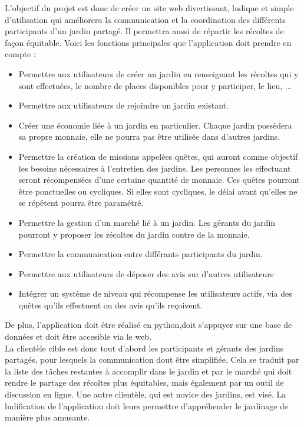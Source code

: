 \documentclass{report}
\begin{document}
    L'objectif du projet est donc de créer un site web divertissant, ludique et simple d’utilisation qui améliorera la communication et la coordination des différents participants d’un jardin partagé. Il permettra aussi de répartir les récoltes de façon équitable. Voici les fonctions principales que l'application doit prendre en compte :
    \begin{itemize}
        \item Permettre aux utilisateurs de créer un jardin en renseignant les récoltes qui y sont effectuées, le nombre de places disponibles pour y participer, le lieu, ...
        \item Permettre aux utilisateurs de rejoindre un jardin existant.
        \item Créer une économie liée à un jardin en particulier. Chaque jardin possèdera sa propre monnaie, elle ne pourra pas être utilisée dans d’autres jardins.
        \item Permettre la création de missions appelées quêtes, qui auront comme objectif les besoins nécessaires à l’entretien des jardins. Les personnes les effectuant seront récompensées d’une certaine quantité de monnaie. Ces quêtes pourront être ponctuelles ou cycliques. Si elles sont cycliques, le délai avant qu'elles ne se répétent pourra être paramétré.
        \item Permettre la gestion d'un marché lié à un jardin. Les gérants du jardin pourront y proposer les récoltes du jardin contre de la monnaie. \item Permettre la communication entre différants participants du jardin.
        \item Permettre aux utilisateurs de déposer des avis sur d'autres utilisateurs 
        \item Intégrer un système de niveau qui récompense les utilisateurs actifs, via des quêtes qu'ils effectuent ou des avis qu'ils reçoivent.
    \end{itemize}

    De plus, l'application doit être réalisé en python,doit s'appuyer sur une base de données et doit être accesible via le web.\\
    
    La clientèle cible est donc tout d'abord les participants et gérants des jardins partagés, pour lesquels la communication dout être simplifiée. Cela se traduit par la liste des tâches restantes à accomplir dans le jardin et par le marché qui doit rendre le partage des récoltes plus équitables, mais également par un outil de discussion en ligne.
    Une autre clientèle, qui est novice des jardins, est visé. La ludification de l'application doit leurs permettre d'appréhender le jardinage de manière plus amusante.
    
\end{document}
